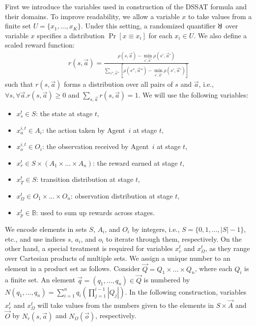 First we introduce the variables used in construction of the DSSAT formula and their domains.
To improve readability, we allow a variable $x$ to take values from a finite set $U=\{x_1,\ldots,x_K\}$.
Under this setting,
a randomized quantifier $\random{}$ over variable $x$ specifies a distribution $\Pr[x\equiv x_i]$ for each $x_i\in U$.
We also define a scaled reward function:
\begin{align*}
    r(s,\vec{a})=\frac{\rho(s,\vec{a})-\min\limits_{s',\vec{a}'}\rho(s',\vec{a}')}{\sum\limits_{s'',\vec{a}''}[\rho(s'',\vec{a}'')-\min\limits_{s',\vec{a}'}\rho(s',\vec{a}')]}
\end{align*}
such that $r(s,\vec{a})$ forms a distribution over all pairs of $s$ and $\vec{a}$,
i.e., $\forall s,\forall \vec{a}.r(s,\vec{a})\geq 0$ and $\sum\limits_{s,\vec{a}}r(s,\vec{a})=1$.
We will use the following variables:
\begin{itemize}
    \item $x_s^t\in S$: the state at stage $t$,
    \item $x_a^{i,t}\in A_i$: the action taken by Agent~$i$ at stage $t$,
    \item $x_o^{i,t}\in O_i$: the observation received by Agent~$i$ at stage $t$,
    \item $x_r^t\in S\times (A_1\times\ldots\times A_n)$: the reward earned at stage $t$,
    \item $x_T^t\in S$: transition distribution at stage $t$,
    \item $x_\Omega^t\in O_1\times\ldots\times O_n$: observation distribution at stage $t$,
    \item $x_p^t\in \mathbb{B}$: used to sum up rewards across stages.
\end{itemize}

We encode elements in sets $S$, $A_i$, and $O_i$ by integers,
i.e., $S=\{0,1,\ldots,|S|-1\}$, etc.,
and use indices $s$, $a_i$, and $o_i$ to iterate through them, respectively.
On the other hand, a special treatment is required for variables $x_r^t$ and $x_\Omega^t$,
as they range over Cartesian products of multiple sets.
We assign a unique number to an element in a product set as follows.
Consider $\vec{Q}=Q_1\times\ldots\times Q_n$, where each $Q_i$ is a finite set.
An element $\vec{q}=(q_1,\ldots,q_n)\in \vec{Q}$ is numbered by $N(q_1,\ldots,q_n)=\sum_{i=1}^n q_i(\prod_{j=1}^{i-1}|Q_j|)$.
In the following construction,
variables $x_r^t$ and $x_\Omega^t$ will take values from the numbers given to the elements in $S\times\vec{A}$ and $\vec{O}$ by $N_r(s,\vec{a})$ and $N_\Omega(\vec{o})$, respectively.

